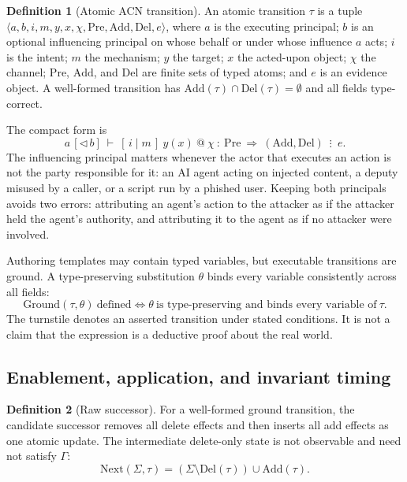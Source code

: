 \documentclass[11pt,letterpaper]{article}
\theoremstyle{definition}
\newtheorem{definition}{Definition}
\newcommand{\St}{\Sigma}
\newcommand{\Inv}{\Gamma}
\newcommand{\Pre}{\mathrm{Pre}}
\newcommand{\Add}{\mathrm{Add}}
\newcommand{\Del}{\mathrm{Del}}
\newcommand{\Next}{\mathrm{Next}}
\newcommand{\evsep}{\mathrel{\vdots}}
\begin{document}
\begin{definition}[Atomic ACN transition]\label{def:atomic}
An atomic transition $\tau$ is a tuple $\langle a,b,i,m,y,x,\chi,\Pre,\Add,\Del,e\rangle$, where $a$ is the executing principal; $b$ is an optional influencing principal on whose behalf or under whose influence $a$ acts; $i$ is the intent; $m$ the mechanism; $y$ the target; $x$ the acted-upon object; $\chi$ the channel; $\Pre$, $\Add$, and $\Del$ are finite sets of typed atoms; and $e$ is an evidence object. A well-formed transition has $\Add(\tau)\cap\Del(\tau)=\emptyset$ and all fields type-correct.
\end{definition}
The compact form is
\begin{equation}
a\,[\triangleleft\, b]\ \vdash\ [\,i\mid m\,]\ y(x)\ @\ \chi\ :\ \Pre\ \Rightarrow\ (\Add,\Del)\ \evsep\ e .
\end{equation}
The influencing principal matters whenever the actor that executes an action is not the party responsible for it: an AI agent acting on injected content, a deputy misused by a caller, or a script run by a phished user. Keeping both principals avoids two errors: attributing an agent's action to the attacker as if the attacker held the agent's authority, and attributing it to the agent as if no attacker were involved.

Authoring templates may contain typed variables, but executable transitions are ground. A type-preserving substitution $\theta$ binds every variable consistently across all fields:
\begin{equation}
\mathrm{Ground}(\tau,\theta)\ \text{defined}\iff \theta\ \text{is type-preserving and binds every variable of}\ \tau .
\end{equation}
The turnstile denotes an asserted transition under stated conditions. It is not a claim that the expression is a deductive proof about the real world.

\subsection{Enablement, application, and invariant timing}

\begin{definition}[Raw successor]
For a well-formed ground transition, the candidate successor removes all delete effects and then inserts all add effects as one atomic update. The intermediate delete-only state is not observable and need not satisfy $\Inv$:
\begin{equation}\label{eq:next}
\Next(\St,\tau)=(\St\setminus\Del(\tau))\cup\Add(\tau).
\end{equation}
\end{definition}
\end{document}
